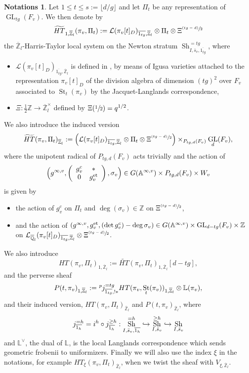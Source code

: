 \documentclass[11pt]{article}
\newcommand{\NoChangel}[1]{%
\expandafter\let\csname old\string#1\endcsname=#1
\let#1=\relax
\newcommand{#1}{\mathcode`l="716C\csname old\string#1\endcsname\mathcode`l="7160 }%
}
\def\hto{\mathrel{\lhook\joinrel\to}}
\newcommand{\psfrac}[2]{\sfrac{(#1)}{#2}}
\DeclareMathOperator{\GL}{GL}
\theoremstyle{plain}
\theoremstyle{definition}
\newtheorem{notas}[equation]{Notations}
\numberwithin{equation}{subsection}
\newcommand\Am{{\mathbb A}}
\newcommand\Qm{{\mathbb Q}}
\newcommand\Zm{{\mathbb Z}}
\newcommand\Lm{{\mathbb L}}
\newcommand\LC{{\mathcal L}}
\newcommand{\lexp}[2]{\kern \scriptspace \vphantom{#2}^{#1}\kern-\scriptspace#2}
\DeclareMathOperator{\sh}{Sh}
\DeclareMathOperator{\val}{val}\NoChangel{\val}
\DeclareMathOperator{\st}{St}
\let \oo=\infty
\begin{document}
\begin{notas}
Let $1 \leq t \leq s:=\lfloor d/g \rfloor$ and let $\Pi_t$ be any representation of
$\GL_{tg}(F_v)$. We then denote by
\[
\widetilde{HT}_{1,\overline \Zm_l}(\pi_v,\Pi_t):=\LC(\pi_v[t]_D)_{\overline{1_{tg}},\overline \Zm_l}
\otimes \Pi_t \otimes \Xi^{\psfrac{tg-d}{2}}
\]
the $\overline \Zm_l$-Harris-Taylor local system on the Newton stratum
$\sh^{=tg}_{I,\bar s_v,\overline{1_{tg}}}$, where
\begin{itemize}
\item $\LC(\pi_v[t]_D)_{\overline{1_{tg}},\overline \Zm_l}$ is defined in \cite[\S IV-1]{h-t}, by means of
Igusa varieties attached to the representation $\pi_v[t]_D$ of the division
algebra of dimension
$(tg)^2$ over $F_v$ associated to $\st_t(\pi_v)$ by the Jacquet-Langlands correspondence,

\item $\Xi:\frac{1}{2} \Zm \to \overline \Zm_l^\times$ defined by $\Xi(\sfrac{1}{2})=q^{1/2}$.
\end{itemize}
We also introduce the induced version
\[
\widetilde{HT}(\pi_v,\Pi_t)_{\overline \Zm_l}:=
\Bigl (\LC(\pi_v[t]_D)_{\overline{1_{tg}},\overline \Zm_l}
\otimes \Pi_t \otimes \Xi^{\psfrac{tg-d}{2}} \Bigr) \times_{P_{tg,d}(F_v)} \GL_d(F_v),
\]
where the unipotent radical of $P_{tg,d}(F_v)$ acts trivially and the action of
\[
\Bigl(g^{\oo,v},\left (\begin{array}{cc} g_v^c & * \\ 0 & g_v^\mathrm{et} \end{array} \right),\sigma_v\Bigr)
\in G(\Am^{\oo,v}) \times P_{tg,d}(F_v) \times W_v
\]
is given by
\begin{itemize}
\item the action of $g_v^c$ on $\Pi_t$ and
$\deg(\sigma_v) \in \Zm$ on $ \Xi^{\psfrac{tg-d}{2}}$,

\item and the action of $(g^{\oo,v},g_v^\mathrm{et},\val(\det g_v^c)-\deg \sigma_v)
\in G(\Am^{\oo,v}) \times \GL_{d-tg}(F_v) \times \Zm$ on $\LC_{\overline \Qm_l}
(\pi_v[t]_D)_{\overline{1_{tg}},\overline \Zm_l} \otimes \Xi^{\psfrac{tg-d}{2}}$.
\end{itemize}
We also introduce
\[
HT(\pi_v,\Pi_t)_{1,\overline \Zm_l}:=\widetilde{HT}(\pi_v,\Pi_t)_{1,\overline \Zm_l}
[d-tg],
\]
and the perverse sheaf
\[
P(t,\pi_v)_{1,\overline \Zm_l}:=\lexp p j^{=tg}_{\overline{1_{tg}},!*} HT(\pi_v,\st_t(\pi_v))_{1,\overline \Zm_l}
\otimes \Lm(\pi_v),
\]
and their induced version, $HT(\pi_v,\Pi_t)_{\overline \Zm_l}$ and $P(t,\pi_v)_{\overline \Zm_l}$, where
\[
j^{=h}_{\overline{1_h}}=i^h \circ j^{\geq h}_{\overline{1_h}}:\sh^{=h}_{I,\bar s_v,\overline{1_h}} \hto
\sh^{\geq h}_{I,\bar s_v} \hto \sh_{I,\bar s_v}
\]
and $\Lm^\vee$, the dual of $\Lm$, is the local Langlands correspondence
which sends geometric frobenii to uniformizers.
Finally we will also use the index $\xi$ in the notations, for example
$HT_\xi(\pi_v,\Pi_t)_{\overline \Zm_l}$,
when we twist the sheaf with $V_{\xi,\overline \Zm_l}$.
\end{notas}
\end{document}

